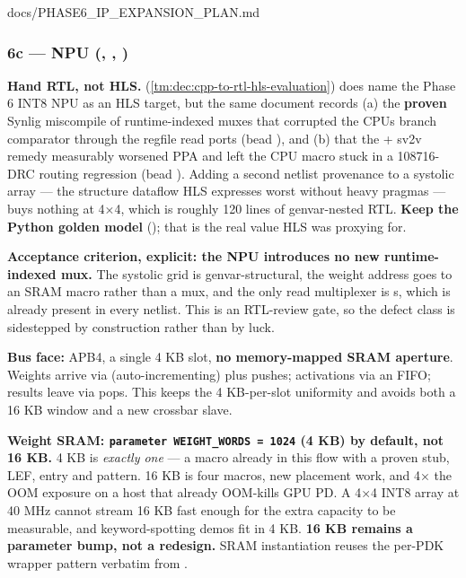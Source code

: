 \begin{relocated}{docs/PHASE6_IP_EXPANSION_PLAN.md}
\subsubsection{\texorpdfstring{6c --- NPU (,
, )}{6c --- NPU (, , )}}\label{ds:ch:phase6-ip-expansion-plan:6c-npu-rtlnpunpu-topsv-npu-mac-arraysv-npu-weight-memsv}

\textbf{Hand RTL, not HLS.}
 (\cref{tm:dec:cpp-to-rtl-hls-evaluation}) does name the Phase 6 INT8
NPU as an HLS target, but the same document records (a) the
\textbf{proven} Synlig  miscompile of runtime-indexed
muxes that corrupted the CPU\textquotesingle s branch comparator through
the regfile read ports (bead ), and (b) that the
 + sv2v remedy measurably worsened
 PPA and left the CPU macro stuck in a 108716-DRC routing
regression (bead ). Adding a second netlist provenance to a
systolic array --- the structure dataflow HLS expresses worst without
heavy pragmas --- buys nothing at 4×4, which is roughly 120 lines of
genvar-nested RTL. \textbf{Keep the Python golden model}
(); that is the real value HLS was proxying
for.

\textbf{Acceptance criterion, explicit: the NPU introduces no new
runtime-indexed mux.} The systolic grid is genvar-structural, the weight
address goes to an SRAM macro rather than a mux, and the only read
multiplexer is \textquotesingle s, which is
already present in every netlist. This is an RTL-review gate, so the
 defect class is sidestepped by construction rather than by
luck.

\textbf{Bus face:} APB4, a single 4 KB slot, \textbf{no memory-mapped
SRAM aperture}. Weights arrive via  (auto-incrementing)
plus  pushes; activations via an  FIFO;
results leave via  pops. This keeps the 4 KB-per-slot
uniformity and avoids both a 16 KB window and a new crossbar slave.

\textbf{Weight SRAM:
\texttt{parameter\ WEIGHT\_\allowbreak{}WORDS\ =\allowbreak{}\ 1024} (4
KB) by default, not 16 KB.} 4 KB is \emph{exactly one}
 --- a macro already in this
flow with a proven stub, LEF,  entry and
 pattern. 16 KB is four macros, new
placement work, and 4× the OOM exposure on a host that already OOM-kills
GPU PD. A 4×4 INT8 array at 40 MHz cannot stream 16 KB fast enough for
the extra capacity to be measurable, and keyword-spotting demos fit in 4
KB. \textbf{16 KB remains a parameter bump, not a redesign.} SRAM
instantiation reuses the per-PDK  wrapper pattern verbatim
from .


\end{relocated}
